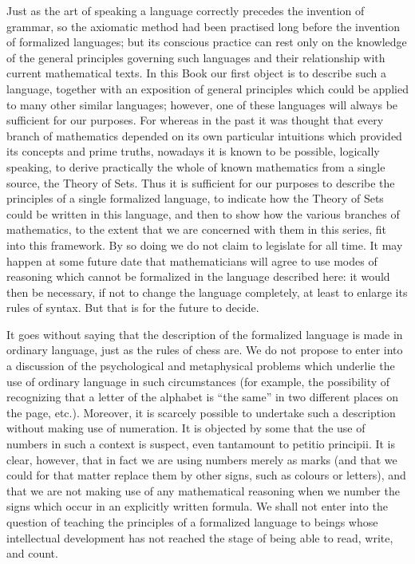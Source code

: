 Just as the art of speaking a language correctly precedes the invention of grammar, so the axiomatic method had been practised long before the invention of formalized languages; but its conscious practice can rest only on the knowledge of the general principles governing such languages and their relationship with current mathematical texts. In this Book our first object is to describe such a language, together with an exposition of general principles which could be applied to many other similar languages; however, one of these languages will always be sufficient for our purposes. For whereas in the past it was thought that every branch of mathematics depended on its own particular intuitions which provided its concepts and prime truths, nowadays it is known to be possible, logically speaking, to derive practically the whole of known mathematics from a single source, the Theory of Sets. Thus it is sufficient for our purposes to describe the principles of a single formalized language, to indicate how the Theory of Sets could be written in this language, and then to show how the various branches of mathematics, to the extent that we are concerned with them in this series, fit into this framework. By so doing we do not claim to legislate for all time. It may happen at some future date that mathematicians will agree to use modes of reasoning which cannot be formalized in the language described here: it would then be necessary, if not to change the language completely, at least to enlarge its rules of syntax. But that is for the future to decide.

It goes without saying that the description of the formalized language is made in ordinary language, just as the rules of chess are. We do not propose to enter into a discussion of the psychological and metaphysical problems which underlie the use of ordinary language in such circumstances (for example, the possibility of recognizing that a letter of the alphabet is ``the same'' in two different places on the page, etc.). Moreover, it is scarcely possible to undertake such a description without making use of numeration. It is objected by some that the use of numbers in such a context is suspect, even tantamount to petitio principii. It is clear, however, that in fact we are using numbers merely as marks (and that we could for that matter replace them by other signs, such as colours or letters), and that we are not making use of any mathematical reasoning when we number the signs which occur in an explicitly written formula. We shall not enter into the question of teaching the principles of a formalized language to beings whose intellectual development has not reached the stage of being able to read, write, and count.


